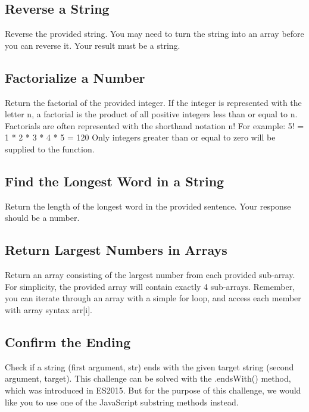 \documentclass{article}%
\begin{document}
%
\subsection{Reverse a String}%
\label{subsec:ReverseaString}%
Reverse the provided string.\newline%
You may need to turn the string into an array before you can reverse it.\newline%
Your result must be a string.\newline%

%
\subsection{Factorialize a Number}%
\label{subsec:FactorializeaNumber}%
Return the factorial of the provided integer.\newline%
If the integer is represented with the letter n, a factorial is the product of all positive integers less than or equal to n.\newline%
Factorials are often represented with the shorthand notation n!\newline%
For example: 5! = 1 * 2 * 3 * 4 * 5 = 120\newline%
Only integers greater than or equal to zero will be supplied to the function.\newline%

%
\subsection{Find the Longest Word in a String}%
\label{subsec:FindtheLongestWordinaString}%
Return the length of the longest word in the provided sentence.\newline%
Your response should be a number.\newline%

%
\subsection{Return Largest Numbers in Arrays}%
\label{subsec:ReturnLargestNumbersinArrays}%
Return an array consisting of the largest number from each provided sub{-}array. For simplicity, the provided array will contain exactly 4 sub{-}arrays.\newline%
Remember, you can iterate through an array with a simple for loop, and access each member with array syntax arr{[}i{]}.\newline%

%
\subsection{Confirm the Ending}%
\label{subsec:ConfirmtheEnding}%
Check if a string (first argument, str) ends with the given target string (second argument, target).\newline%
This challenge can be solved with the .endsWith() method, which was introduced in ES2015. But for the purpose of this challenge, we would like you to use one of the JavaScript substring methods instead.\newline%
\end{document}
